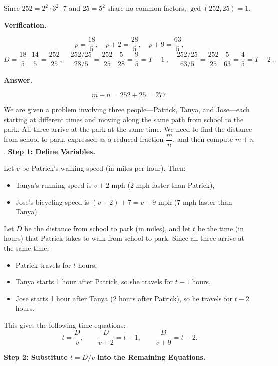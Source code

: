 \documentclass{llmxive}
\begin{document}
\begin{tcolorbox}[title=The early training stage model (unscaled), breakable]
Since $252 = 2^2 \cdot 3^2 \cdot 7$ and $25 = 5^2$ share no common factors, $\gcd(252,25)=1$.

\medskip
\textbf{Verification.}

\[
p = \frac{18}{5},\quad p+2 = \frac{28}{5},\quad p+9 = \frac{63}{5},
\]
\[
D = \frac{18}{5}\cdot\frac{14}{5} = \frac{252}{25},\quad
\frac{252/25}{28/5} = \frac{252}{25}\cdot\frac{5}{28} = \frac{9}{5} = T-1\ ,\quad
\frac{252/25}{63/5} = \frac{252}{25}\cdot\frac{5}{63} = \frac{4}{5} = T-2\ .
\]

\medskip
\textbf{Answer.}

\[
m + n = 252 + 25 = \boxed{277}.
\]


\end{tcolorbox}


\begin{tcolorbox}[title=The early training stage model (scaled):, breakable]
We are given a problem involving three people---Patrick, Tanya, and Jose---each
starting at different times and moving along the same path from school to the
park. All three arrive at the park at the same time. We need to find the distance from school to park, expressed as a reduced fraction $\dfrac{m}{n}$,
and then compute $m+n$.              
\medskip
\textbf{Step 1: Define Variables.}

Let $v$ be Patrick's walking speed (in miles per hour). Then:
\begin{itemize}
  \item Tanya's running speed is $v+2$ mph (2 mph faster than Patrick),
  \item Jose's bicycling speed is $(v+2)+7 = v+9$ mph (7 mph faster than Tanya).
\end{itemize}
Let $D$ be the distance from school to park (in miles), and let $t$ be the
time (in hours) that Patrick takes to walk from school to park. Since all three
arrive at the same time:
\begin{itemize}
  \item Patrick travels for $t$ hours,
  \item Tanya starts 1 hour after Patrick, so she travels for $t-1$ hours,
  \item Jose starts 1 hour after Tanya (2 hours after Patrick), so he travels
        for $t-2$ hours.
\end{itemize}
This gives the following time equations:
\[
t = \frac{D}{v}, \qquad
\frac{D}{v+2} = t-1, \qquad
\frac{D}{v+9} = t-2.
\]

\medskip                                                                                                                                                                      
\textbf{Step 2: Substitute $t = D/v$ into the Remaining Equations.}
 

\end{tcolorbox}
\end{document}
